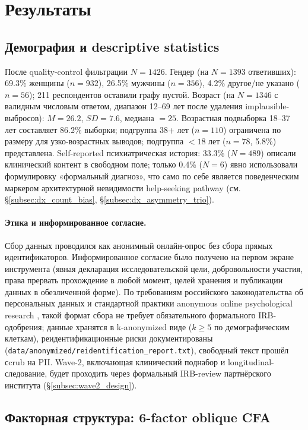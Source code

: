 \section{Результаты}
\label{sec:results}

\subsection{Демография и descriptive statistics}

После quality-control фильтрации $N = 1426$. Гендер (на $N = 1393$ ответивших): 69.3\% женщины ($n = 932$), 26.5\% мужчины ($n = 356$), 4.2\% другое/не указано ($n = 56$); 211 респондентов оставили графу пустой. Возраст (на $N = 1346$ с валидным числовым ответом, диапазон 12--69 лет после удаления implausible-выбросов): $M = 26.2$, $SD = 7.6$, медиана $= 25$. Возрастная подвыборка 18--37 лет составляет 86.2\% выборки; подгруппа 38+ лет ($n = 110$) ограничена по размеру для узко-возрастных выводов; подгруппа $<18$ лет ($n = 78$, 5.8\%) представлена. Self-reported психиатрическая история: 33.3\% ($N = 489$) описали клинический контент в свободном поле; только 0.4\% ($N = 6$) явно использовали формулировку «формальный диагноз», что само по себе является поведенческим маркером архитектурной невидимости help-seeking pathway (см. §\ref{subsec:dx_count_bias}, §\ref{subsec:dx_asymmetry_trio}).

\paragraph{Этика и информированное согласие.} Сбор данных проводился как анонимный онлайн-опрос без сбора прямых идентификаторов. Информированное согласие было получено на первом экране инструмента (явная декларация исследовательской цели, добровольности участия, права прервать прохождение в любой момент, целей хранения и публикации данных в обезличенной форме). По требованиям российского законодательства об персональных данных и стандартной практики anonymous online psychological research \citep{nosek2012}, такой формат сбора не требует обязательного формального IRB-одобрения; данные хранятся в k-anonymized виде ($k \geq 5$ по демографическим клеткам), реидентификационные риски документированы (\texttt{data/anonymized/reidentification\_report.txt}), свободный текст прошёл сcrub на PII. Wave-2, включающая клинический поднабор и longitudinal-следование, будет проходить через формальный IRB-review партнёрского института (§\ref{subsec:wave2_design}).

\subsection{Факторная структура: 6-factor oblique CFA}

